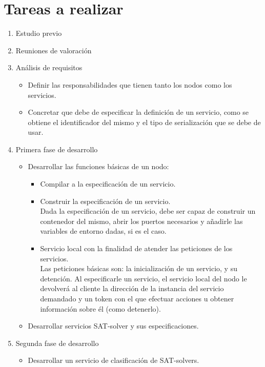 \documentclass[11pt]{article}
\begin{document}
	\section{Tareas a realizar}
		\begin{enumerate}
			\item Estudio previo
			\item Reuniones de valoración
			\item Análisis de requisitos
				\begin{itemize}
					\item Definir las responsabilidades que tienen tanto los nodos como los servicios.
					\item Concretar que debe de especificar la definición de un servicio, como se obtiene el 
						identificador del mismo y el tipo de serialización que
						se debe de usar.
				\end{itemize}
			\item Primera fase de desarrollo
				\begin{itemize}
					\item Desarrollar las funciones básicas de un nodo:
					\begin{itemize}
						\item Compilar a la especificación de un servicio.
						\item Construir la especificación de un servicio. \\
							Dada la especificación de un servicio, debe ser capaz de construir un contenedor del mismo,
							abrir los puertos necesarios y añadirle las variables de entorno dadas, si es el caso.
						\item Servicio local con la finalidad de atender las peticiones de los servicios. \\
							Las peticiones básicas son: la inicialización de un servicio, y su detención.
							Al especificarle un servicio, el servicio local del nodo le devolverá al cliente la dirección 
							de la instancia del servicio demandado y un token con el que efectuar acciones u obtener información 
							sobre él (como detenerlo).
					\end{itemize}
					\item Desarrollar servicios SAT-solver y sus especificaciones.
				\end{itemize}
			\item Segunda fase de desarrollo
				\begin{itemize}
					\item Desarrollar un servicio de clasificación de SAT-solvers. \\

\end{itemize}
\end{enumerate}
\end{document}
